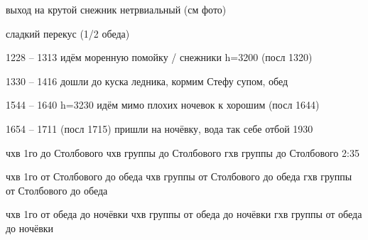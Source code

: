 выход на крутой снежник нетрвиальный (см фото)

сладкий перекус (1/2 обеда)

1228 -- 1313 идём моренную помойку / снежники h=3200 (посл 1320)

1330 -- 1416 дошли до куска ледника, кормим Стефу супом, обед

1544 -- 1640 h=3230 идём мимо плохих ночевок к хорошим (посл 1644)

1654 -- 1711 (посл 1715) пришли на ночёвку, вода так себе
отбой 1930

чхв 1го до Столбового
чхв группы до Столбового
гхв группы до Столбового 2:35

чхв 1го от Столбового до обеда
чхв группы от Столбового до обеда
гхв группы от Столбового до обеда

чхв 1го от обеда до ночёвки
чхв группы от обеда до ночёвки
гхв группы от обеда до ночёвки
    \FloatBarrier

